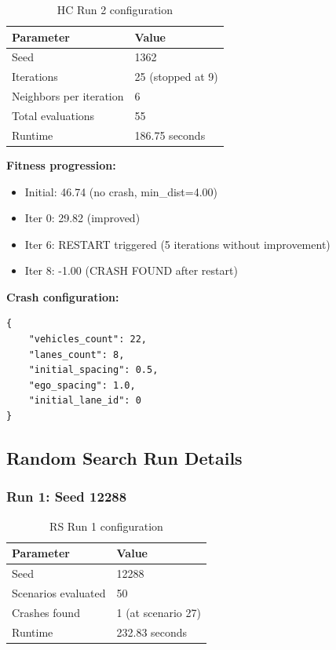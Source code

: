 \begin{table}[H]
\centering
\begin{tabular}{|l|l|}
\hline
\textbf{Parameter} & \textbf{Value} \\
\hline
Seed & 1362 \\
Iterations & 25 (stopped at 9) \\
Neighbors per iteration & 6 \\
Total evaluations & 55 \\
Runtime & 186.75 seconds \\
\hline
\end{tabular}
\caption{HC Run 2 configuration}
\end{table}

\textbf{Fitness progression:}
\begin{itemize}
    \item Initial: 46.74 (no crash, min\_dist=4.00)
    \item Iter 0: 29.82 (improved)
    \item Iter 6: RESTART triggered (5 iterations without improvement)
    \item Iter 8: -1.00 (CRASH FOUND after restart)
\end{itemize}

\textbf{Crash configuration:}
\begin{verbatim}
{
    "vehicles_count": 22,
    "lanes_count": 8,
    "initial_spacing": 0.5,
    "ego_spacing": 1.0,
    "initial_lane_id": 0
}
\end{verbatim}

\subsection{Random Search Run Details}

\subsubsection{Run 1: Seed 12288}

\begin{table}[H]
\centering
\begin{tabular}{|l|l|}
\hline
\textbf{Parameter} & \textbf{Value} \\
\hline
Seed & 12288 \\
Scenarios evaluated & 50 \\
Crashes found & 1 (at scenario 27) \\
Runtime & 232.83 seconds \\
\hline
\end{tabular}
\caption{RS Run 1 configuration}
\end{table}

